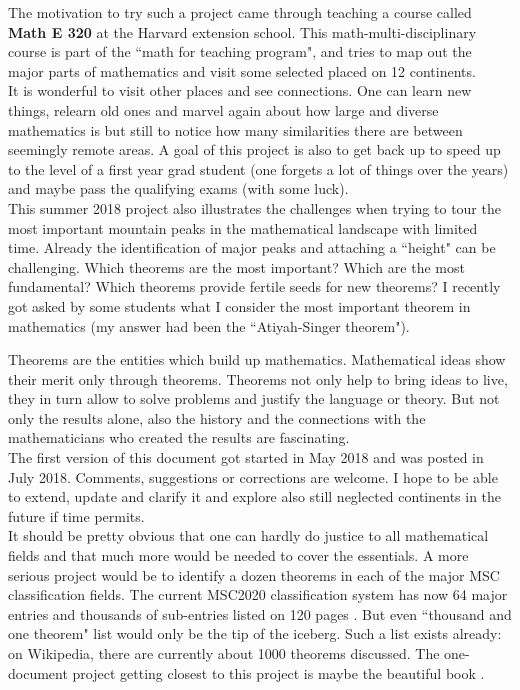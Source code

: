 \documentclass[12pt]{amsart}
\begin{document}
The motivation to try such a project came  through teaching
a course called {\bf Math E 320} at the Harvard extension school. This
math-multi-disciplinary course is part of the ``math for teaching program",
and tries to map out the major parts of mathematics and visit some selected 
placed on 12 continents. \\

It is wonderful to visit other places and see connections. One can learn 
new things, relearn old ones and marvel again about how large and diverse 
mathematics is but still to notice how many similarities there are between 
seemingly remote areas. 
A goal of this project is also to get back up to speed up to the level of 
a first year grad student (one forgets a lot of things over the years) and
maybe pass the qualifying exams (with some luck). \\

This summer 2018 project also illustrates the challenges
when trying to tour the most important mountain peaks in the 
mathematical landscape with limited time. Already the identification of
major peaks and attaching a ``height" can be challenging. Which theorems
are the most important? Which are the most fundamental? Which theorems
provide fertile seeds for new theorems? I recently got asked by some 
students what I consider the most important theorem in mathematics 
(my answer had been the ``Atiyah-Singer theorem"). \\

Theorems are the entities which build up mathematics. 
Mathematical ideas show their merit only through theorems. 
Theorems not only help to bring ideas to live, they in turn 
allow to solve problems and justify the language or theory. 
But not only the results alone, also the history and the connections with the
mathematicians who created the results are fascinating. \\

The first version of this document got started in May 2018 
and was posted in July 2018. Comments, suggestions or corrections are welcome. 
I hope to be able to extend, update and clarify it and explore 
also still neglected continents in the future if time permits. \\

It should be pretty obvious that one can hardly do justice 
to all mathematical fields and that much more would be needed to 
cover the essentials. A more serious project would be to identify a dozen 
theorems in each of the major MSC classification fields. The current MSC2020 classification
system has now 64 major entries and thousands of sub-entries listed on 120 pages \cite{AMS2020}.
But even ``thousand and one theorem" list would only be the tip of the iceberg.
Such a list exists already: on Wikipedia, there are currently about 1000 theorems 
discussed. The one-document project getting closest to this project is 
maybe the beautiful book \cite{Neunhauserer}.
\end{document}
